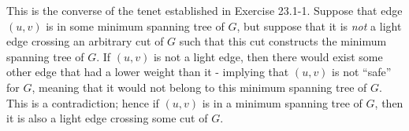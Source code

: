 This is the converse of the tenet established in Exercise 23.1-1. Suppose that edge $ (u,v) $ is in some minimum spanning tree of $ G $, but suppose that it is \textit{not} a light edge crossing an arbitrary cut of $ G $ such that this cut constructs the minimum spanning tree of $ G $. If $ (u,v) $ is not a light edge, then there would exist some other edge that had a lower weight than it - implying that $ (u,v) $ is not ``safe'' for $ G $, meaning that it would not belong to this minimum spanning tree of $ G $. This is a contradiction; hence if $ (u,v) $ is in a minimum spanning tree of $ G $, then it is also a light edge crossing some cut of $ G $.